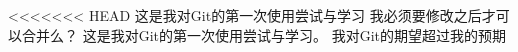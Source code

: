 \documentclass[UTF8]{ctexart}
\title{}
\author{冯上伦\\PB16001754}
\begin{document}
\maketitle
\section{}
<<<<<<< HEAD
 这是我对Git的第一次使用尝试与学习
 我必须要修改之后才可以合并么？
 这是我对Git的第一次使用尝试与学习。
 我对Git的期望超过我的预期


\section{}

\section{}
\end{document}
